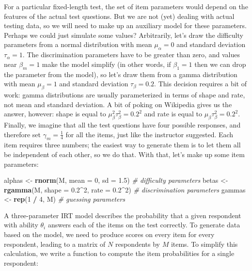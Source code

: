 \documentclass[
]{book}
\newenvironment{Shaded}{\begin{snugshade}}{\end{snugshade}}
\newcommand{\AttributeTok}[1]{\textcolor[rgb]{0.13,0.29,0.53}{#1}}
\newcommand{\CommentTok}[1]{\textcolor[rgb]{0.56,0.35,0.01}{\textit{#1}}}
\newcommand{\DecValTok}[1]{\textcolor[rgb]{0.00,0.00,0.81}{#1}}
\newcommand{\FloatTok}[1]{\textcolor[rgb]{0.00,0.00,0.81}{#1}}
\newcommand{\FunctionTok}[1]{\textcolor[rgb]{0.13,0.29,0.53}{\textbf{#1}}}
\newcommand{\NormalTok}[1]{#1}
\newcommand{\OtherTok}[1]{\textcolor[rgb]{0.56,0.35,0.01}{#1}}
\newcommand{\SpecialCharTok}[1]{\textcolor[rgb]{0.81,0.36,0.00}{\textbf{#1}}}
\begin{document}
For a particular fixed-length test, the set of item parameters would depend on the features of the actual test questions.
But we are not (yet) dealing with actual testing data, so we will need to make up an auxiliary model for these parameters.
Perhaps we could just simulate some values?
Arbitrarily, let's draw the difficulty parameters from a normal distribution with mean \(\mu_\alpha = 0\) and standard deviation \(\tau_\alpha = 1\).
The discrimination parameters have to be greater than zero, and values near \(\beta_m = 1\) make the model simplify (in other words, if \(\beta_1 = 1\) then we can drop the parameter from the model), so let's draw them from a gamma distribution with mean \(\mu_\beta = 1\) and standard deviation \(\tau_\beta = 0.2\).
This decision requires a bit of work: gamma distributions are usually parameterized in terms of shape and rate, not mean and standard deviation.
A bit of poking on Wikipedia gives us the answer, however:
shape is equal to \(\mu_\beta^2 \tau_\beta^2 = 0.2^2\) and rate is equal to \(\mu_\beta \tau_\beta^2 = 0.2^2\).
Finally, we imagine that all the test questions have four possible responses, and therefore set \(\gamma_m = \frac{1}{4}\) for all the items, just like the instructor suggested.
Each item requires three numbers; the easiest way to generate them is to let them all be independent of each other, so we do that.
With that, let's make up some item parameters:

\begin{Shaded}
\begin{Highlighting}[]
\NormalTok{alphas }\OtherTok{\textless{}{-}} \FunctionTok{rnorm}\NormalTok{(M, }\AttributeTok{mean =} \DecValTok{0}\NormalTok{, }\AttributeTok{sd =} \FloatTok{1.5}\NormalTok{)           }\CommentTok{\# difficulty parameters}
\NormalTok{betas }\OtherTok{\textless{}{-}} \FunctionTok{rgamma}\NormalTok{(M, }\AttributeTok{shape =} \FloatTok{0.2}\SpecialCharTok{\^{}}\DecValTok{2}\NormalTok{, }\AttributeTok{rate =} \FloatTok{0.2}\SpecialCharTok{\^{}}\DecValTok{2}\NormalTok{)  }\CommentTok{\# discrimination parameters}
\NormalTok{gammas }\OtherTok{\textless{}{-}} \FunctionTok{rep}\NormalTok{(}\DecValTok{1} \SpecialCharTok{/} \DecValTok{4}\NormalTok{, M)                          }\CommentTok{\# guessing parameters}
\end{Highlighting}
\end{Shaded}

A three-parameter IRT model describes the probability that a given respondent with ability \(\theta_i\) answers each of the items on the test correctly.
To generate data based on the model, we need to produce scores on every item for every respondent, leading to a matrix of \(N\) respondents by \(M\) items.
To simplify this calculation, we write a function to compute the item probabilities for a single respondent:
\end{document}
